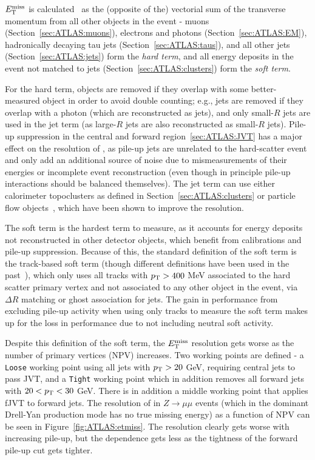 $E_{\text{T}}^\text{miss}$ is calculated~\cite{Aad:2016nrq,Aaboud:2018tkc,ATLAS-CONF-2018-023} as the (opposite of the) vectorial sum of the transverse momentum from all other objects in the event - muons (Section~\ref{sec:ATLAS:muons}), electrons and photons (Section~\ref{sec:ATLAS:EM}), hadronically decaying tau jets (Section~\ref{sec:ATLAS:taus}), and all other jets (Section~\ref{sec:ATLAS:jets}) form the \textit{hard term}, and all energy deposits in the event not matched to jets (Section~\ref{sec:ATLAS:clusters}) form the \textit{soft term}.

For the hard term, objects are removed if they overlap with some better-measured object in order to avoid double counting; e.g., jets are removed if they overlap with a photon (which are reconstructed as jets), and only small-$R$ jets are used in the jet term (as large-$R$ jets are also reconstructed as small-$R$ jets).
Pile-up suppression in the central and forward region~\ref{sec:ATLAS:JVT} has a major effect on the resolution of \Etmiss{}, as pile-up jets are unrelated to the hard-scatter event and only add an additional source of noise due to mismeasurements of their energies or incomplete event reconstruction (even though in principle pile-up interactions should be \pt{} balanced themselves).
The jet term can use either calorimeter topoclusters as defined in Section~\ref{sec:ATLAS:clusters} or particle flow objects~\cite{Aaboud:2017aca}, which have been shown to improve the \Etmiss{} resolution.

The soft term is the hardest term to measure, as it accounts for energy deposits not reconstructed in other detector objects, which benefit from calibrations and pile-up suppression.
Because of this, the standard definition of the soft term is the track-based soft term (though different definitions have been used in the past~\cite{Aad:2012re,Aad:2016nrq}), which only uses all tracks with $p_{\text{T}}>400$ MeV associated to the hard scatter primary vertex and not associated to any other object in the event, via $\Delta R$ matching or ghost association for jets.
The gain in performance from excluding pile-up activity when using only tracks to measure the soft term makes up for the loss in performance due to not including neutral soft activity.

Despite this definition of the soft term, the $E_{\text{T}}^\text{miss}$ resolution gets worse as the number of primary vertices (NPV) increases.
Two working points are defined - a \texttt{Loose} working point using all jets with $p_{\text{T}}>20$ GeV, requiring central jets to pass JVT, and a \texttt{Tight} working point which in addition removes all forward jets with $20<p_{\text{T}}<30$ GeV.
There is in addition a middle working point that applies fJVT to forward jets.
The resolution of \Etmiss{} in $Z\rightarrow \mu\mu$ events (which in the dominant Drell-Yan production mode has no true missing energy) as a function of NPV can be seen in Figure~\ref{fig:ATLAS:etmiss}.
The resolution clearly gets worse with increasing pile-up, but the dependence gets less as the tightness of the forward pile-up cut gets tighter.

